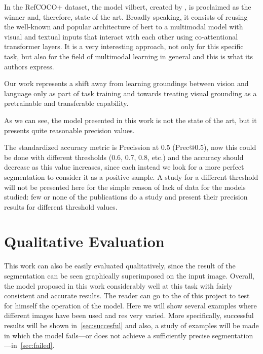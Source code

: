 In the RefCOCO+ dataset, the model \gls{vilbert}, created by
, is proclaimed as the winner and, therefore, state of the
art. Broadly speaking, it consists of reusing the well-known and popular
architecture of \gls{bert} to a multimodal model with visual and textual inputs
that interact with each other using co-attentional transformer layers. It is a
very interesting approach, not only for this specific task, but also for the
field of multimodal learning in general and this is what its authors express.

\begin{quoteBox}
  Our work represents a shift away from learning groundings between vision and
  language only as part of task training and towards treating visual grounding
  as a pretrainable and transferable capability.
  \tcblower{}
\end{quoteBox}

As we can see, the model presented in this work is not the state of the art,
but it presents quite reasonable precision values.

The standardized accuracy metric is Precission at 0.5 (Prec@0.5), now this
could be done with different thresholds (0.6, 0.7, 0.8, etc.) and the accuracy
should decrease as this value increases, since each instead we look for a more
perfect segmentation to consider it as a positive sample. A study for a
different threshold will not be presented here for the simple reason of lack of
data for the models studied: few or none of the publications do a study and
present their precision results for different threshold values.


\section{Qualitative Evaluation}\label{sec:qualitative-eval-res}

This work can also be easily evaluated qualitatively, since the result of the
segmentation can be seen graphically superimposed on the input image. Overall,
the model proposed in this work considerably well at this task with fairly
consistent and accurate results. The reader can go to the
 of this project to test for
himself the operation of the model. Here we will show several examples where
different images have been used and \glspl{re} very varied. More specifically,
successful results will be shown in\ \vref{sec:succesful} and also, a study of
examples will be made in which the model fails---or does not achieve a
sufficiently precise segmentation---in\ \vref{sec:failed}.



